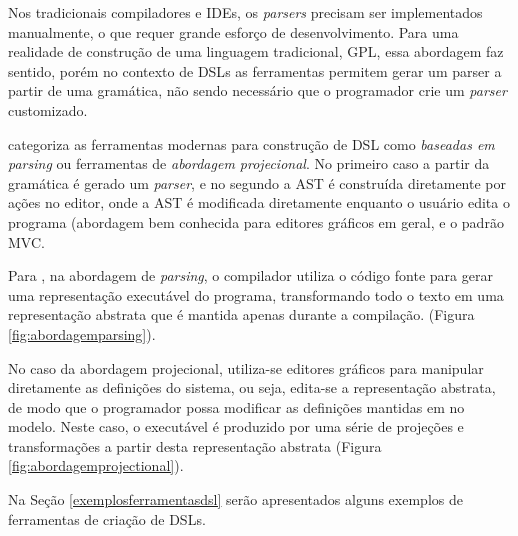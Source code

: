 Nos tradicionais compiladores e \gls{IDE}s, os \textit{parsers} precisam ser implementados manualmente, o que requer grande esforço de desenvolvimento. Para uma realidade de construção de uma linguagem tradicional, \gls{GPL}, essa abordagem faz sentido, porém no contexto de \gls{DSL}s as ferramentas permitem gerar um parser a partir de uma gramática, não sendo necessário que o programador crie um \textit{parser} customizado.

 categoriza as ferramentas modernas para construção de \gls{DSL} como \textit{baseadas em parsing} ou ferramentas de \textit{abordagem projecional}. No primeiro caso a partir da gramática é gerado um \textit{parser}, e no segundo a \gls{AST} é construída diretamente por ações no editor, onde a \gls{AST} é modificada diretamente enquanto o usuário edita o programa (abordagem bem conhecida para editores gráficos em geral, e o padrão \gls{MVC}. 

Para , na abordagem de \textit{parsing}, o compilador utiliza o código fonte para gerar uma representação executável do programa, transformando todo o texto em uma representação abstrata que é mantida apenas durante a compilação. (Figura \ref{fig:abordagemparsing}). 



\newpage
No caso da abordagem projecional, utiliza-se editores gráficos para manipular diretamente as definições do sistema, ou seja, edita-se a representação abstrata, de modo que o programador possa modificar as definições mantidas em no modelo. Neste caso, o executável é produzido por uma série de projeções e transformações a partir desta representação abstrata (Figura \ref{fig:abordagemprojectional}).




Na Seção \ref{exemplosferramentasdsl} serão apresentados alguns exemplos de ferramentas de criação de \gls{DSL}s.

